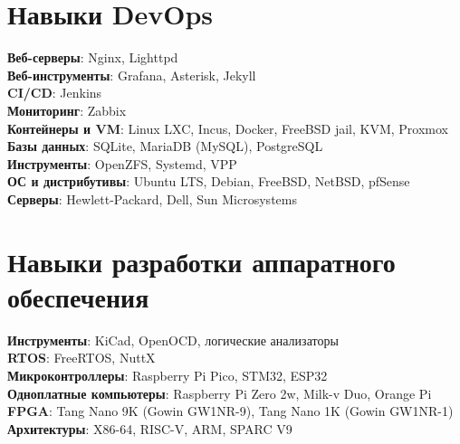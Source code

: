 \documentclass[a4paper,11pt]{article}
\begin{document}
\section{Навыки DevOps}
\begin{itemize}[leftmargin=0.15in, label={}]
    \normalsize{\item{
                    \textbf{Веб-серверы}{: Nginx, Lighttpd} \\
                    \textbf{Веб-инструменты}{: Grafana, Asterisk, Jekyll} \\
                    \textbf{CI/CD}{: Jenkins} \\
                    \textbf{Мониторинг}{: Zabbix} \\
                    \textbf{Контейнеры и VM}{: Linux LXC, Incus, Docker, FreeBSD jail, KVM, Proxmox} \\
                    \textbf{Базы данных}{: SQLite, MariaDB (MySQL), PostgreSQL} \\
                    \textbf{Инструменты}{: OpenZFS, Systemd, VPP} \\
                    \textbf{ОС и дистрибутивы}{: Ubuntu LTS, Debian, FreeBSD, NetBSD, pfSense} \\
                    \textbf{Серверы}{: Hewlett-Packard, Dell, Sun Microsystems} \\
              }}
\end{itemize}

\section{Навыки разработки аппаратного обеспечения}
\begin{itemize}[leftmargin=0.15in, label={}]
    \normalsize{\item{
                    \textbf{Инструменты}{: KiCad, OpenOCD, логические анализаторы} \\
                    \textbf{RTOS}{: FreeRTOS, NuttX} \\
                    \textbf{Микроконтроллеры}{: Raspberry Pi Pico, STM32, ESP32} \\
                    \textbf{Одноплатные компьютеры}{: Raspberry Pi Zero 2w, Milk-v Duo, Orange Pi} \\
                    \textbf{FPGA}{: Tang Nano 9K (Gowin GW1NR-9), Tang Nano 1K (Gowin GW1NR-1)} \\
                    \textbf{Архитектуры}{: X86-64, RISC-V, ARM, SPARC V9} \\
              }}
\end{itemize}
\end{document}
